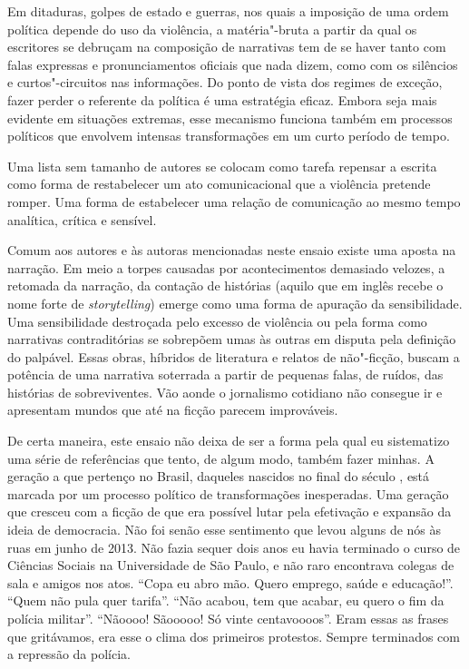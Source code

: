 Em ditaduras, golpes de estado e guerras, nos quais a imposição de uma
ordem política depende do uso da violência, a matéria"-bruta a partir da
qual os escritores se debruçam na composição de narrativas tem de se
haver tanto com falas expressas e pronunciamentos oficiais que nada
dizem, como com os silêncios e curtos"-circuitos nas informações. Do
ponto de vista dos regimes de exceção, fazer perder o referente da
política é uma estratégia eficaz. Embora seja mais evidente em situações
extremas, esse mecanismo funciona também em processos políticos que
envolvem intensas transformações em um curto período de tempo.

Uma lista sem tamanho de autores se colocam como tarefa repensar a
escrita como forma de restabelecer um ato comunicacional que a violência
pretende romper. Uma forma de estabelecer uma relação de comunicação ao
mesmo tempo analítica, crítica e sensível.

Comum aos autores e às autoras mencionadas neste ensaio existe uma aposta na
narração. Em meio a torpes causadas por acontecimentos demasiado
velozes, a retomada da narração, da contação de histórias (aquilo que em
inglês recebe o nome forte de \emph{storytelling}) emerge como uma forma
de apuração da sensibilidade. Uma sensibilidade destroçada pelo excesso %
de violência ou pela forma como narrativas contraditórias se sobrepõem
umas às outras em disputa pela definição do palpável. Essas obras,
híbridos de literatura e relatos de não"-ficção, buscam a potência de uma
narrativa soterrada a partir de pequenas falas, de ruídos, das histórias
de sobreviventes. Vão aonde o jornalismo cotidiano não consegue ir e
apresentam mundos que até na ficção parecem improváveis.

\asterisc

De certa maneira, este ensaio não deixa de ser a forma pela qual eu
sistematizo uma série de referências que tento, de algum modo, também
fazer minhas. A geração a que pertenço no Brasil, daqueles nascidos no
final do século , está marcada por um processo político de
transformações inesperadas. Uma geração que cresceu com a ficção de que
era possível lutar pela efetivação e expansão da ideia de democracia.
Não foi senão esse sentimento que levou alguns de nós às ruas em junho
de 2013. Não fazia sequer dois anos eu havia terminado o curso de Ciências
Sociais na Universidade de São Paulo, e não raro encontrava colegas de
sala e amigos nos atos. ``Copa eu abro mão. Quero emprego, saúde e
educação!''. ``Quem não pula quer tarifa''. ``Não acabou, tem que
acabar, eu quero o fim da polícia militar''. ``Nãoooo! Sãooooo! Só vinte
centavoooos''. Eram essas as frases que gritávamos, era esse o clima dos
primeiros protestos. Sempre terminados com a repressão da polícia.

